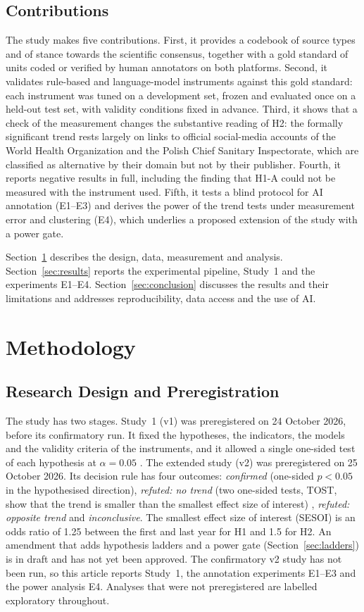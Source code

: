 \documentclass[10pt,a4paper]{article}
\begin{document}
\subsection{Contributions}
The study makes five contributions. First, it provides a codebook of source types and of
stance towards the scientific consensus, together with a gold standard of units coded or
verified by human annotators on both platforms. Second, it validates rule-based and
language-model instruments against this gold standard: each instrument was tuned on a
development set, frozen and evaluated once on a held-out test set, with validity
conditions fixed in advance. Third, it shows that a check of the measurement changes the substantive
reading of H2: the formally significant trend rests largely on links to official
social-media accounts of the World Health Organization and the Polish Chief Sanitary
Inspectorate, which are classified as alternative by their domain but not by their
publisher. Fourth, it reports negative results in full, including the finding that H1-A
could not be measured with the instrument used. Fifth, it tests a blind protocol for AI
annotation (E1--E3) and derives the power of the trend tests under measurement error and
clustering (E4), which underlies a proposed extension of the study with a power gate.

Section~\ref{sec:methodology} describes the design, data, measurement and analysis.
Section~\ref{sec:results} reports the experimental pipeline, Study~1 and the experiments
E1--E4. Section~\ref{sec:conclusion} discusses the results and their limitations and addresses
reproducibility, data access and the use of AI.

\section{Methodology}
\label{sec:methodology}

\subsection{Research Design and Preregistration}
The study has two stages. Study~1 (v1) was preregistered on 24 October 2026, before its confirmatory
run. It fixed the hypotheses, the indicators, the models and the validity criteria of the instruments, and
it allowed a single one-sided test of each hypothesis at $\alpha = 0.05$ \cite{nosek2018}. The extended
study (v2) was preregistered on 25 October 2026. Its decision rule has four outcomes:
\emph{confirmed} (one-sided $p < 0.05$ in the hypothesised direction), \emph{refuted: no trend} (two
one-sided tests, TOST, show that the trend is smaller than the smallest effect size of interest)
\cite{lakens2018}, \emph{refuted: opposite trend} and \emph{inconclusive}. The smallest effect size of
interest (SESOI) is an odds ratio of 1.25 between the first and last year for H1 and 1.5 for H2. An
amendment that adds hypothesis ladders and a power gate (Section~\ref{sec:ladders}) is in draft and has not
yet been approved. The confirmatory v2 study has not been run, so this article reports Study~1, the
annotation experiments E1--E3 and the power analysis E4. Analyses that were not preregistered are labelled exploratory throughout.
\end{document}
